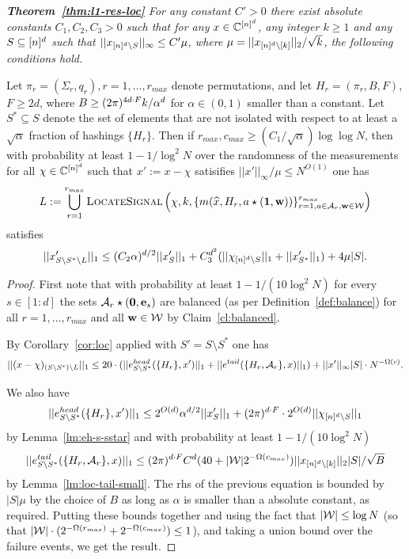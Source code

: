 {\em {\bf Theorem~\ref{thm:l1-res-loc}}
For any constant $C'>0$ there exist absolute constants $C_1, C_2, C_3>0$ such that for any $x\in \mathbb{C}^{[n]^d}$, any integer $k\geq 1$ and any $S\subseteq {[n]^d}$ such that $||x_{{[n]^d}\setminus S}||_\infty\leq C'\mu$, where $\mu=||x_{{[n]^d}\setminus [k]}||_2/\sqrt{k}$, the following conditions hold.

Let $\pi_r=(\Sigma_r, q_r), r=1,\ldots, r_{max}$ denote permutations, and let $H_r=(\pi_r, B, F)$, $F\geq 2d$, where $B\geq (2\pi)^{4d\cdot F} k/\alpha^d$ for $\alpha\in (0, 1)$ smaller than a constant. Let $S^*\subseteq S$ denote the set of elements that are not isolated with respect to at least a $\sqrt{\alpha}$ fraction of hashings $\{H_r\}$. Then if $r_{max}, c_{max}\geq (C_1/\sqrt{\alpha})\log\log N$, then with probability at least $1-1/\log^2 N$ over the randomness of the measurements for all $\chi\in \mathbb{C}^{[n]^d}$ such that $x':=x-\chi$ satisifies $||x'||_\infty/\mu\leq N^{O(1)}$ one has
$$
L:=\bigcup_{r=1}^{r_{max}}\textsc{LocateSignal}\left(\chi, k, \{m(\widehat{x}, H_r, a\star (\mathbf{1}, \mathbf{w}))\}_{r=1, a\in {\mathcal{A}}_r, \mathbf{w}\in \mathcal{W}}^{r_{max}}\right)
$$
satisfies
$$
||x'_{S\setminus S^*\setminus L}||_1\leq (C_2\alpha)^{d/2} ||x'_S||_1+C_3^{d^2}(||\chi_{{[n]^d}\setminus S}||_1+||x'_{S^*}||_1)+4\mu |S|.
$$

}
\begin{proof}
First note that with probability at least  $1-1/(10\log^2 N)$  for every $s\in [1:d]$ the sets ${\mathcal{A}}_r\star (\mathbf{0}, \mathbf{e}_s)$ are balanced (as per Definition~\ref{def:balance}) for all $r=1,\ldots, r_{max}$ and all $\mathbf{w}\in \mathcal{W}$ by Claim~\ref{cl:balanced}.

By Corollary~\ref{cor:loc} applied with $S'=S\setminus S^*$ one has 
$$
||(x-\chi)_{(S\setminus S^*)\setminus L}||_1\leq 20 \cdot (||e^{head}_{S\setminus S^*}(\{H_r\}, x')||_1+||e^{tail}(\{H_r, {\mathcal{A}}_r\}, x)||_1)+||x'||_\infty |S|\cdot N^{-\Omega(c)}.
$$

We also have  
$$
||e^{head}_{S\setminus S^*}(\{H_r\}, x')||_1\leq 2^{O(d)}\alpha^{d/2} ||x'_S||_1+(2\pi)^{d\cdot F} \cdot 2^{O(d)} ||\chi_{{[n]^d}\setminus S}||_1
$$
by Lemma~\ref{lm:eh-s-sstar} and with probability at least $1-1/(10\log^2 N)$
\begin{equation*}
||e^{tail}_{S\setminus S^*}(\{H_r, {\mathcal{A}}_r\}, x)||_1\leq (2\pi)^{d\cdot F} C^d (40+|\mathcal{W}|2^{-\Omega(c_{max})})  ||x_{{[n]^d} \setminus [k]}||_2|S|/\sqrt{B} 
\end{equation*}
by Lemma~\ref{lm:loc-tail-small}. The rhs of the previous equation is bounded by $|S|\mu$ by the choice of $B$ as long as $\alpha$ is smaller than a absolute constant, as required.
Putting these bounds together and using the fact that $|\mathcal{W}|\leq \log N$ (so that $|\mathcal{W}|\cdot (2^{-\Omega(r_{max})}+2^{-\Omega(c_{max})})\leq 1$), and taking a union bound over the failure events, we get the result.
\end{proof}

